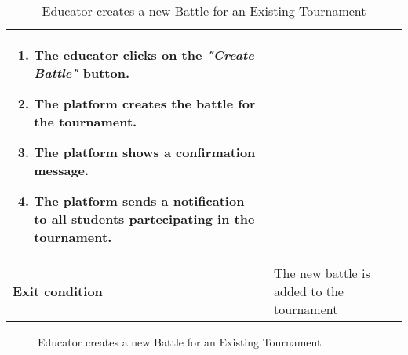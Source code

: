 \begin{enumerate}[label=\textbf{UC\arabic*}:,leftmargin=1.3cm]
\begin{table}[H]
\begin{tabular}{|l|p{11.9cm}|}
\begin{enumerate}[label=\arabic*.]
                              \item The educator clicks on the \emph{"Create Battle"} button.
                              \item The platform creates the battle for the tournament.
                              \item The platform shows a confirmation message.
                              \item The platform sends a notification to all students partecipating in the tournament.
                        \end{enumerate} \\\hline
                        \textbf{Exit condition}  & The new battle is added to the tournament                                                                 \\\hline
                  \end{tabular}
                  \caption{Educator creates a new Battle for an Existing Tournament        }
                  \label{table:Educator creates a new Battle for an Existing Tournament         }
            \end{table}

            \begin{figure}[H]
                  \centering
                  \caption{Educator creates a new Battle for an Existing Tournament        }
                  \label{fig:Educator creates a new Battle for an Existing Tournament         }
            \end{figure}
            \pagebreak


\end{enumerate}
